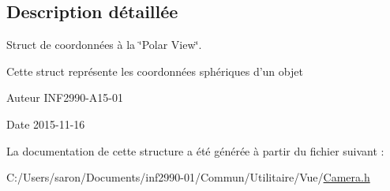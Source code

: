 \subsection{Description détaillée}
Struct de coordonnées à la \char`\"{}\-Polar View\char`\"{}. 

Cette struct représente les coordonnées sphériques d'un objet

\begin{DoxyAuthor}{Auteur}
I\-N\-F2990-\/\-A15-\/01 
\end{DoxyAuthor}
\begin{DoxyDate}{Date}
2015-\/11-\/16 
\end{DoxyDate}


La documentation de cette structure a été générée à partir du fichier suivant \-:\begin{DoxyCompactItemize}
\item 
C\-:/\-Users/saron/\-Documents/inf2990-\/01/\-Commun/\-Utilitaire/\-Vue/\hyperlink{_camera_8h}{Camera.\-h}\end{DoxyCompactItemize}

